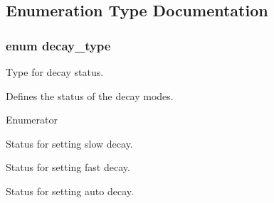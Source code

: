 \subsection{Enumeration Type Documentation}
\hypertarget{group__DRV8825_gafe05744bd777532cf059c0d7293a7ab8}{
\subsubsection[{decay\-\_\-type}]{\setlength{\rightskip}{0pt plus 5cm}enum {\bf decay\-\_\-type}}}\label{group__DRV8825_gafe05744bd777532cf059c0d7293a7ab8}


Type for decay status. 

Defines the status of the decay modes. \begin{Desc}
\item[Enumerator]\par
\begin{description}
\item[{\em 
\hypertarget{group__DRV8825_ggafe05744bd777532cf059c0d7293a7ab8a05f6a902065ce2f3355101cf657f4ba4}{S\-L\-O\-W\-\_\-\-D\-E\-C\-A\-Y}\label{group__DRV8825_ggafe05744bd777532cf059c0d7293a7ab8a05f6a902065ce2f3355101cf657f4ba4}
}]Status for setting slow decay. \item[{\em 
\hypertarget{group__DRV8825_ggafe05744bd777532cf059c0d7293a7ab8af9716e06b54f75cbd7dedc154a7d49e2}{F\-A\-S\-T\-\_\-\-D\-E\-C\-A\-Y}\label{group__DRV8825_ggafe05744bd777532cf059c0d7293a7ab8af9716e06b54f75cbd7dedc154a7d49e2}
}]Status for setting fast decay. \item[{\em 
\hypertarget{group__DRV8825_ggafe05744bd777532cf059c0d7293a7ab8abbe5a117b6da07d1a52741cfff2e927a}{A\-U\-T\-O\-\_\-\-D\-E\-C\-A\-Y}\label{group__DRV8825_ggafe05744bd777532cf059c0d7293a7ab8abbe5a117b6da07d1a52741cfff2e927a}
}]Status for setting auto decay. \end{description}
\end{Desc}


